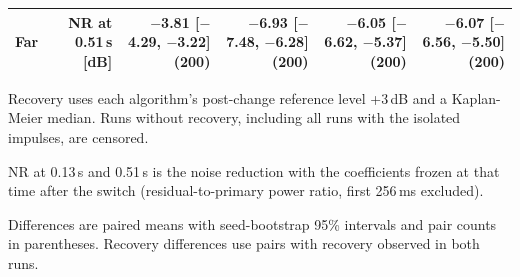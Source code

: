 \begin{table}[tbp]
\begin{tabular}{lrrrrr}
Far & NR at 0.51\,s [dB] & $-$3.81 [$-$4.29, $-$3.22] (200) & $-$6.93 [$-$7.48, $-$6.28] (200) & $-$6.05 [$-$6.62, $-$5.37] (200) & $-$6.07 [$-$6.56, $-$5.50] (200) \\
\bottomrule
\end{tabular}
\par\medskip
\begin{minipage}{0.98\textwidth}
\scriptsize
Recovery uses each algorithm's post-change reference level +3\,dB and a Kaplan-Meier median. Runs without recovery, including all runs with the isolated impulses, are censored.\par
NR at 0.13\,s and 0.51\,s is the noise reduction with the coefficients frozen at that time after the switch (residual-to-primary power ratio, first 256\,ms excluded).\par
Differences are paired means with seed-bootstrap 95\% intervals and pair counts in parentheses. Recovery differences use pairs with recovery observed in both runs.\par
\end{minipage}
\end{table}
